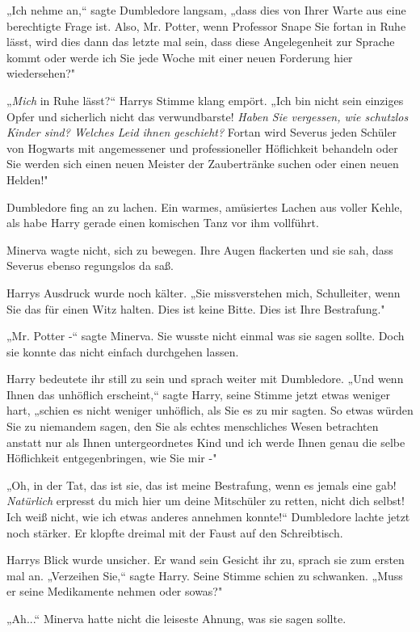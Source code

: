 {„Ich nehme an,“ sagte Dumbledore langsam, „dass dies von Ihrer Warte aus eine berechtigte Frage ist. Also, Mr. Potter, wenn Professor Snape Sie fortan in Ruhe lässt, wird dies dann das letzte mal sein, dass diese Angelegenheit zur Sprache kommt oder werde ich Sie jede Woche mit einer neuen Forderung hier wiedersehen?"

„\emph{Mich} in Ruhe lässt?“ Harrys Stimme klang empört. „Ich bin nicht sein einziges Opfer und sicherlich nicht das verwundbarste! \emph{Haben Sie vergessen, wie schutzlos Kinder sind? Welches Leid ihnen geschieht?} Fortan wird Severus jeden Schüler von Hogwarts mit angemessener und professioneller Höflichkeit behandeln oder Sie werden sich einen neuen Meister der Zaubertränke suchen oder einen neuen Helden!"

Dumbledore fing an zu lachen. Ein warmes, amüsiertes Lachen aus voller Kehle, als habe Harry gerade einen komischen Tanz vor ihm vollführt.

Minerva wagte nicht, sich zu bewegen. Ihre Augen flackerten und sie sah, dass Severus ebenso regungslos da saß.

Harrys Ausdruck wurde noch kälter. „Sie missverstehen mich, Schulleiter, wenn Sie das für einen Witz halten. Dies ist keine Bitte. Dies ist Ihre Bestrafung."

„Mr. Potter -“ sagte Minerva. Sie wusste nicht einmal was sie sagen sollte. Doch sie konnte das nicht einfach durchgehen lassen.

Harry bedeutete ihr still zu sein und sprach weiter mit Dumbledore. „Und wenn Ihnen das unhöflich erscheint,“ sagte Harry, seine Stimme jetzt etwas weniger hart, „schien es nicht weniger unhöflich, als Sie es zu mir sagten. So etwas würden Sie zu niemandem sagen, den Sie als echtes menschliches Wesen betrachten anstatt nur als Ihnen untergeordnetes Kind und ich werde Ihnen genau die selbe Höflichkeit entgegenbringen, wie Sie mir -"

„Oh, in der Tat, das ist sie, das ist meine Bestrafung, wenn es jemals eine gab! \emph{Natürlich} erpresst du mich hier um deine Mitschüler zu retten, nicht dich selbst! Ich weiß nicht, wie ich etwas anderes annehmen konnte!“ Dumbledore lachte jetzt noch stärker. Er klopfte dreimal mit der Faust auf den Schreibtisch.

Harrys Blick wurde unsicher. Er wand sein Gesicht ihr zu, sprach sie zum ersten mal an. „Verzeihen Sie,“ sagte Harry. Seine Stimme schien zu schwanken. „Muss er seine Medikamente nehmen oder sowas?"

„Ah...“ Minerva hatte nicht die leiseste Ahnung, was sie sagen sollte.

}
